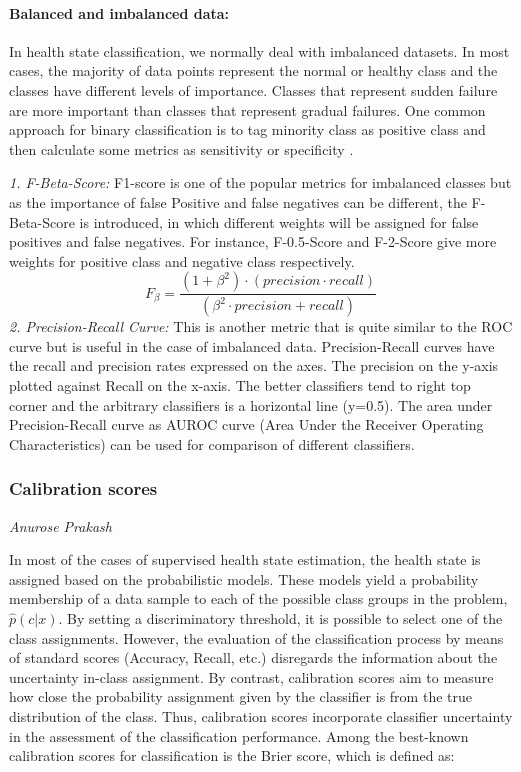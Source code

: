\paragraph{Balanced and imbalanced data:}
In health state classification, we normally deal with imbalanced datasets. In most cases, the majority of data points represent the normal or healthy class and the classes have different levels of importance. Classes that represent sudden failure are more important than classes that represent gradual failures.
One common approach for binary classification is to tag minority class as positive class and then calculate some metrics as sensitivity or specificity \cite{DBLP:journals/corr/BrancoTR15, article}.

\textit{1. F-Beta-Score:} F1-score is one of the popular metrics for imbalanced classes but as the importance of false Positive and false negatives can be different, the F-Beta-Score is introduced, in which different weights will be assigned for false positives and false negatives. For instance, F-0.5-Score and F-2-Score give more weights for positive class and negative class respectively.
\begin{equation}
 F_{\beta } =\frac{(1+\beta ^{2})\cdot (precision\cdot recall )}{(\beta ^{2}\cdot precision+ recall)}
\end{equation}
\textit{2. Precision-Recall Curve:} This is another metric that is quite similar to the ROC curve but is useful in the case of imbalanced data. Precision-Recall curves have the recall and precision rates expressed on the axes. The precision on the y-axis plotted against Recall on the x-axis. The better classifiers tend to right top corner and the arbitrary classifiers is a horizontal line (y=0.5). The area under Precision-Recall curve as AUROC curve (Area Under the Receiver Operating Characteristics) can be used for comparison of different classifiers.



\subsubsection{Calibration scores}
\vspace*{-12mm}\hfill{\normalsize\emph{Anurose Prakash }}

In most of the cases of supervised health state estimation, the health state is assigned based on the probabilistic models. These models yield a probability membership of a data sample to each of the possible class groups in the problem, $\widehat{p}(c|x)$. By setting a discriminatory threshold, it is possible to select one of the class assignments. However, the evaluation of the classification process by means of standard scores (Accuracy, Recall, etc.) disregards the information about the uncertainty in-class assignment. By contrast, calibration scores aim to measure how close the probability assignment given by the classifier is from the true distribution of the class. Thus, calibration scores incorporate classifier uncertainty in the assessment of the classification performance. Among the best-known calibration scores for classification is the Brier score, which is defined as:

